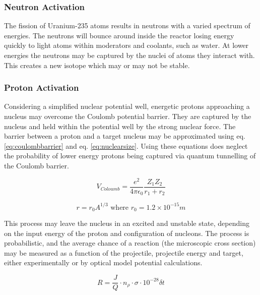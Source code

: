 \subsubsection{Neutron Activation}

The fission of Uranium-235 atoms results in neutrons with a varied spectrum of energies.  The neutrons will bounce around inside the reactor losing energy quickly to light atoms within moderators and coolants, such as water.  At lower energies the neutrons may be captured by the nuclei of atoms they interact with.  This creates a new isotope which may or may not be stable.



\subsubsection{Proton Activation}
\label{section:protonactivation}

Considering a simplified nuclear potential well, energetic protons approaching a nucleus may overcome the Coulomb potential barrier.  They are captured by the nucleus and held within the potential well by the strong nuclear force.  The barrier between a proton and a target nucleus may be approximated using eq. \ref{eq:coulombbarrier}\cite{coulombhyperphysics} and eq. \ref{eq:nuclearsize}\cite{nuclearsizehyperphysics}.  Using these equations does neglect the probability of lower energy protons being captured via quantum tunnelling of the Coulomb barrier.

\begin{equation}
V_{Coloumb} = \frac{e^2}{4 \pi \epsilon_{0}} \frac{Z_1 Z_2}{r_{1} + r_{2}}
\label{eq:coulombbarrier}
\end{equation}

\begin{equation}
r = r_{0} A^{1/3} \text{ where } r_0 = 1.2 \times 10^{-15}m
\label{eq:nuclearsize}
\end{equation}

This process may leave the nucleus in an excited and unstable state, depending on the input energy of the proton and configuration of nucleons.  The process is probabilistic, and the average chance of a reaction (the microscopic cross section) may be measured as a function of the projectile, projectile energy and target, either experimentally or by optical model potential calculations.  

\begin{equation}
R = \frac{J}{Q} \cdot n_{\rho} \cdot \sigma \cdot 10^{-28} \delta t
\label{eq:reactioncrosssection}
\end{equation}

